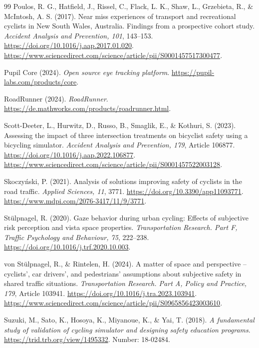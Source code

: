 \begin{thebibliography}{99}
Poulos, R. G., Hatfield, J., Rissel, C., Flack, L. K., Shaw, L., Grzebieta, R.,
\& McIntosh, A. S. (2017). Near miss experiences of transport and recreational
cyclists in New South Wales, Australia. Findings from a prospective cohort
study. \emph{Accident Analysis and Prevention, 101}, 143--153.
\url{https://doi.org/10.1016/j.aap.2017.01.020}.
\url{https://www.sciencedirect.com/science/article/pii/S0001457517300477}.

Pupil Core (2024). \emph{Open source eye tracking platform}.
\url{https://pupil-labs.com/products/core}.

RoadRunner (2024). \emph{RoadRunner}.
\url{https://de.mathworks.com/products/roadrunner.html}.

Scott-Deeter, L., Hurwitz, D., Russo, B., Smaglik, E., \& Kothuri, S. (2023).
Assessing the impact of three intersection treatments on bicyclist safety using
a bicycling simulator. \emph{Accident Analysis and Prevention, 179}, Article
106877. \url{https://doi.org/10.1016/j.aap.2022.106877}.
\url{https://www.sciencedirect.com/science/article/pii/S0001457522003128}.

Skoczyński, P. (2021). Analysis of solutions improving safety of cyclists in the
road traffic. \emph{Applied Sciences, 11}, 3771.
\url{https://doi.org/10.3390/app11093771}.
\url{https://www.mdpi.com/2076-3417/11/9/3771}.

Stülpnagel, R. (2020). Gaze behavior during urban cycling: Effects of subjective
risk perception and vista space properties. \emph{Transportation Research. Part
F, Traffic Psychology and Behaviour, 75}, 222--238.
\url{https://doi.org/10.1016/j.trf.2020.10.003}.

von Stülpnagel, R., \& Rintelen, H. (2024). A matter of space and perspective --
cyclists', car drivers', and pedestrians' assumptions about subjective safety in
shared traffic situations. \emph{Transportation Research. Part A, Policy and
Practice, 179}, Article 103941.
\url{https://doi.org/10.1016/j.tra.2023.103941}.
\url{https://www.sciencedirect.com/science/article/pii/S0965856423003610}.

Suzuki, M., Sato, K., Hosoya, K., Miyanoue, K., \& Yai, T. (2018). \emph{A
fundamental study of validation of cycling simulator and designing safety
education programs}. \url{https://trid.trb.org/view/1495332}. Number: 18-02484.


\end{thebibliography}
